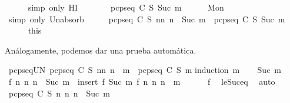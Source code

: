 \begin{isabellebody}
\ \ \ \ \isamarkupfalse%
\ {\isacharparenleft}simp\ only{\isacharcolon}\ HI{\isacharparenright}\isanewline
\ \ \isamarkupfalse%
\ \isamarkupfalse%
\ {\isachardoublequoteopen}{\isasymdots}\ {\isacharequal}\ pcp{\isacharunderscore}seq\ C\ S\ {\isacharparenleft}Suc\ m{\isacharparenright}{\isachardoublequoteclose}\isanewline
\ \ \ \ \isamarkupfalse%
\ Mon\ \isamarkupfalse%
\ {\isacharparenleft}simp\ only{\isacharcolon}\ Un{\isacharunderscore}absorb{}{\isacharparenright}\isanewline
\ \ \isamarkupfalse%
\ \isamarkupfalse%
\ {\isachardoublequoteopen}{\isasymUnion}{\isacharbraceleft}pcp{\isacharunderscore}seq\ C\ S\ n{\isacharbar}n{\isachardot}\ n\ {\isasymle}\ {\isacharparenleft}Suc\ m{\isacharparenright}{\isacharbraceright}\ {\isacharequal}\ pcp{\isacharunderscore}seq\ C\ S\ {\isacharparenleft}Suc\ m{\isacharparenright}{\isachardoublequoteclose}\isanewline
\ \ \ \ \isamarkupfalse%
\ this\isanewline
{}\isamarkupfalse%
%
\endisatagproof
{\isafoldproof}%
%
\isadelimproof
%
\endisadelimproof
%
\begin{isamarkuptext}%
Análogamente, podemos dar una prueba automática.%
\end{isamarkuptext}\isamarkuptrue%
\isamarkupfalse%
\ pcp{\isacharunderscore}seq{\isacharunderscore}UN{\isacharcolon}\ {\isachardoublequoteopen}{\isasymUnion}{\isacharbraceleft}pcp{\isacharunderscore}seq\ C\ S\ n{\isacharbar}n{\isachardot}\ n\ {\isasymle}\ m{\isacharbraceright}\ {\isacharequal}\ pcp{\isacharunderscore}seq\ C\ S\ m{\isachardoublequoteclose}\isanewline
%
\isadelimproof
%
\endisadelimproof
%
\isatagproof
{}\isamarkupfalse%
{\isacharparenleft}induction\ m{\isacharparenright}\isanewline
\ \ \isamarkupfalse%
\ {\isacharparenleft}Suc\ m{\isacharparenright}\isanewline
\ \ \isamarkupfalse%
\ {\isachardoublequoteopen}{\isacharbraceleft}f\ n\ {\isacharbar}n{\isachardot}\ n\ {\isasymle}\ Suc\ m{\isacharbraceright}\ {\isacharequal}\ insert\ {\isacharparenleft}f\ {\isacharparenleft}Suc\ m{\isacharparenright}{\isacharparenright}\ {\isacharbraceleft}f\ n\ {\isacharbar}n{\isachardot}\ n\ {\isasymle}\ m{\isacharbraceright}{\isachardoublequoteclose}\ \isanewline
\ \ \ \ \ f\ \isamarkupfalse%
\ le{\isacharunderscore}Suc{\isacharunderscore}eq\ \isamarkupfalse%
\ auto\isanewline
\ \ \isamarkupfalse%
\ {\isachardoublequoteopen}{\isacharbraceleft}pcp{\isacharunderscore}seq\ C\ S\ n\ {\isacharbar}n{\isachardot}\ n\ {\isasymle}\ Suc\ m{\isacharbraceright}\ {\isacharequal}\ \isanewline

\end{isabellebody}

